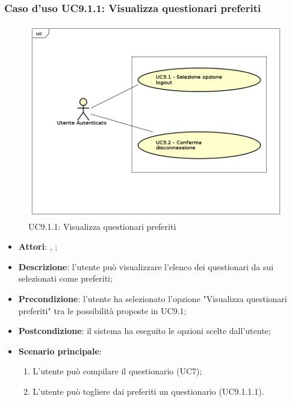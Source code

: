 		\subsubsection{Caso d'uso UC9.1.1: Visualizza questionari preferiti}
		\label{UC9.1.1}
		\begin{figure}[h]
			\centering
		\includegraphics[scale=0.7,keepaspectratio]{UML/UC9.png}
			\caption{UC9.1.1: Visualizza questionari preferiti}
		\end{figure}
		\FloatBarrier
		\begin{itemize}
			\item \textbf{Attori}: \uau, \uaupro;
			\item \textbf{Descrizione}: l'utente può visualizzare l'elenco dei questionari da sui selezionati come preferiti;
			\item \textbf{Precondizione}: l'utente ha selezionato l'opzione "Visualizza questionari preferiti" tra le possibilità proposte in UC9.1;
			\item \textbf{Postcondizione}: il sistema ha eseguito le opzioni scelte dall'utente;
			\item \textbf{Scenario principale}: 
				\begin{enumerate}
					\item L'utente può compilare il questionario (UC7);
					\item L'utente può togliere dai preferiti un questionario (UC9.1.1.1).
				\end{enumerate}
		\end{itemize}
		
